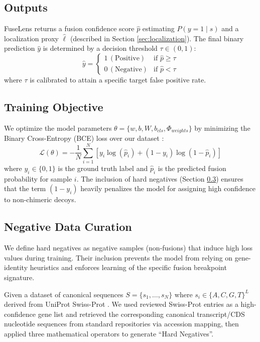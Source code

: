\documentclass{bioinfo}
\begin{document}
\subsection{Outputs}
FuseLens returns a fusion confidence score $\hat{p}$ estimating $P(y=1 \mid s)$ and a localization proxy $\hat{\ell}$ (described in Section \ref{sec:localization}). The final binary prediction $\hat{y}$ is determined by a decision threshold $\tau \in (0,1)$:
\begin{equation}
\hat{y} =
\begin{cases}
1 \, (\text{Positive}) & \text{if } \hat{p} \ge \tau \\
0 \, (\text{Negative}) & \text{if } \hat{p} < \tau
\end{cases}
\end{equation}
where $\tau$ is calibrated to attain a specific target false positive rate.
\subsection{Training Objective}
We optimize the model parameters $\theta = \{w, b, W, b_{cls}, \Phi_{weights}\}$ by minimizing the Binary Cross-Entropy (BCE) loss over our dataset :
\begin{equation}
\mathcal{L}(\theta) = -\frac{1}{N} \sum_{i=1}^{N} \left[ y_i \log(\hat{p}_i) + (1 - y_i) \log(1 - \hat{p}_i) \right]
\end{equation}
where $y_i \in \{0,1\}$ is the ground truth label and $\hat{p}_i$ is the predicted fusion probability for sample $i$. The inclusion of hard negatives (Section \ref{NegativeDataCuration}) ensures that the term $(1-y_i)$ heavily penalizes the model for assigning high confidence to non-chimeric decoys.
\subsection{Negative Data Curation}\label{NegativeDataCuration}
We define hard negatives as negative samples (non-fusions) that induce high loss values during training. Their inclusion prevents the model from relying on gene-identity heuristics and enforces learning of the specific fusion breakpoint signature.

Given a dataset of canonical sequences $S=\{s_1, \dots, s_N\}$ where $s_i \in \{A,C,G,T\}^L$ derived from UniProt Swiss-Prot \cite{uniprot_db}. We used reviewed Swiss-Prot entries as a high-confidence gene list and retrieved the corresponding canonical transcript/CDS nucleotide sequences from standard repositories via accession mapping, then applied three mathematical operators to generate ``Hard Negatives''.
\end{document}
